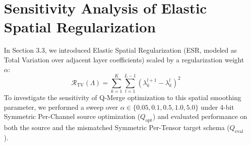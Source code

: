 \documentclass{article}
\theoremstyle{plain}
\theoremstyle{definition}
\theoremstyle{remark}
\begin{document}










\newpage
\appendix
\onecolumn

\section{Sensitivity Analysis of Elastic Spatial Regularization}
\label{appendix:alpha_sensitivity}

In Section 3.3, we introduced Elastic Spatial Regularization (ESR, modeled as Total Variation over adjacent layer coefficients) scaled by a regularization weight $\alpha$:
\begin{equation}
    \mathcal{R}_{\text{TV}}(\Lambda) = \sum_{k=1}^K \sum_{l=1}^{L-1} (\lambda_k^{l+1} - \lambda_k^l)^2
\end{equation}
To investigate the sensitivity of Q-Merge optimization to this spatial smoothing parameter, we performed a sweep over $\alpha \in \{0.05, 0.1, 0.5, 1.0, 5.0\}$ under 4-bit Symmetric Per-Channel source optimization ($Q_{\text{opt}}$) and evaluated performance on both the source and the mismatched Symmetric Per-Tensor target schema ($Q_{\text{eval}}$).
\end{document}
